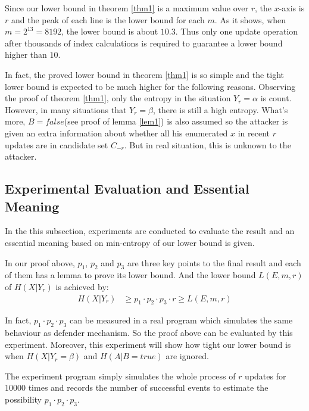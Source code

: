 \documentclass[10pt, conference, compsocconf]{IEEEtran}
\begin{document}
        Since our lower bound in theorem \ref{thm1} is a maximum value
        over $r$, the $x$-axis is $r$ and the peak of each line
        is the lower bound for each $m$. As it shows, when $m = 2^{13} = 8192$, the lower
        bound is about $10.3$.
        Thus only one update operation after thousands of index calculations is required
        to guarantee a lower bound higher than $10$.

        In fact, the proved lower bound in theorem \ref{thm1} is so
        simple and the tight lower bound is expected to be much higher
        for the following reasons.
        Observing the proof of theorem \ref{thm1}, only the
        entropy in the situation $Y_r = \alpha$ is count. However, in
        many situations that $Y_r = \beta$, there is still a high entropy.
        What's more, $B = false$(see proof of lemma \ref{lem1}) is also assumed so the attacker is
        given an extra information about whether all his enumerated $x$
        in recent $r$ updates are in candidate set $C_{-r}$. But
        in real situation, this is unknown to the attacker.

    \subsection{Experimental Evaluation and Essential Meaning}
        In the this subsection, experiments
	    are conducted to evaluate the result and an essential meaning based on min-entropy 
    	of our lower bound is given.

        In our proof above, $p_1$,
        $p_2$ and $p_3$ are
        three key points to the final result and each of them
        has a lemma to prove its lower bound.
        And the lower bound $L(E, m, r)$ of $H(X | Y_r)$ is achieved by:
        \begin{align*}
            H(X | Y_r) &\geq p_1 \cdot p_2 \cdot p_3 \cdot r
                \geq L(E, m, r)
        \end{align*}

        In fact, $p_1 \cdot p_2 \cdot p_3$ can be measured in a real program which
        simulates the same behaviour as defender mechanism.
        So the proof above can be evaluated by this experiment.
        Moreover, this experiment will show how tight our lower bound is
        when $H(X | Y_r = \beta)$ and $H(A | B = true)$ are ignored.

        The experiment program simply simulates the whole process of $r$ updates
        for $10000$ times and records the number of successful events
        to estimate the possibility $p_1 \cdot p_2 \cdot p_3$.
\end{document}
